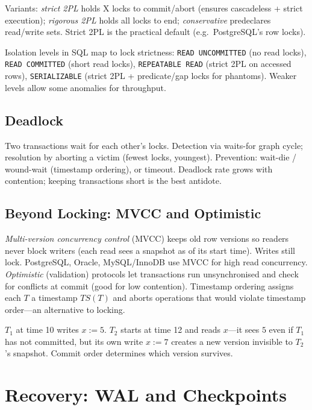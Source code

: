 Variants: \emph{strict 2PL} holds X locks to commit/abort (ensures cascadeless + strict execution); \emph{rigorous 2PL} holds all locks to end; \emph{conservative} predeclares read/write sets. Strict 2PL is the practical default (e.g.\ PostgreSQL's row locks).

Isolation levels in SQL map to lock strictness: \texttt{READ UNCOMMITTED} (no read locks), \texttt{READ COMMITTED} (short read locks), \texttt{REPEATABLE READ} (strict 2PL on accessed rows), \texttt{SERIALIZABLE} (strict 2PL + predicate/gap locks for phantoms). Weaker levels allow some anomalies for throughput.

\subsection{Deadlock}

Two transactions wait for each other's locks. Detection via waits-for graph cycle; resolution by aborting a victim (fewest locks, youngest). Prevention: wait-die / wound-wait (timestamp ordering), or timeout. Deadlock rate grows with contention; keeping transactions short is the best antidote.

\subsection{Beyond Locking: MVCC and Optimistic}

\emph{Multi-version concurrency control} (MVCC) keeps old row versions so readers never block writers (each read sees a snapshot as of its start time). Writes still lock. PostgreSQL, Oracle, MySQL/InnoDB use MVCC for high read concurrency. \emph{Optimistic} (validation) protocols let transactions run unsynchronised and check for conflicts at commit (good for low contention). Timestamp ordering assigns each $T$ a timestamp $\mathit{TS}(T)$ and aborts operations that would violate timestamp order---an alternative to locking.

\begin{example}
$T_1$ at time 10 writes $x:=5$. $T_2$ starts at time 12 and reads $x$---it sees $5$ even if $T_1$ has not committed, but its own write $x:=7$ creates a new version invisible to $T_2$'s snapshot. Commit order determines which version survives.
\end{example}

\section{Recovery: WAL and Checkpoints}
\label{sec:recovery}

